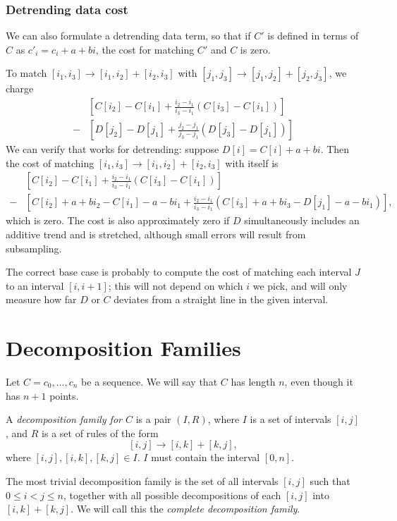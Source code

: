 \documentclass{article}
\begin{document}
\subsubsection{Detrending data cost}
We can also formulate a detrending data term, so that if $C'$ is
defined in terms of $C$ as $c'_i = c_i + a + bi$, the cost for
matching $C'$ and $C$ is zero.

To match $[i_1,i_3]\to [i_1,i_2] + [i_2, i_3]$ with $[j_1,j_3]\to [j_1,j_2] + [j_2, j_3]$, we charge
\begin{align*}
&\left[ C[i_2] - C[i_1] + \frac{i_2 - i_1}{i_3 - i_1}(C[i_3] - C[i_1])\right] \\
-&\left[ D[j_2] - D[j_1] + \frac{j_2 - j_1}{j_3 - j_1}(D[j_3] - D[j_1])\right] 
\end{align*}
We can verify that works for detrending: suppose $D[i] = C[i] + a + bi$. Then the cost of matching 
$[i_1,i_3]\to [i_1,i_2] + [i_2, i_3]$ with itself is
\begin{align*}
&\left[ C[i_2] - C[i_1] + \frac{i_2 - i_1}{i_3 - i_1}(C[i_3] - C[i_1])\right] \\
-&\left[ C[i_2] + a + bi_2 - C[i_1] -a - bi_1 + \frac{i_2 - i_1}{i_3 - i_1}(C[i_3] + a + bi_3 - D[j_1] - a - bi_1)\right],
\end{align*}
which is zero. The cost is also approximately zero if $D$
simultaneously includes an additive trend and is stretched, although
small errors will result from subsampling. 

The correct base case is probably to compute the cost of matching each
interval $J$ to an interval $[i,i+1]$; this will not depend on which
$i$ we pick, and will only measure how far $D$ or $C$ deviates from a
straight line in the given interval.


\section{Decomposition Families}

\begin{defn}
Let $C=c_0,\dots,c_n$ be a sequence. We will say that $C$ has length
$n$, even though it has $n+1$ points.

A {\em decomposition family for $C$} is a pair $(I, R)$, where $I$ is
a set of intervals $[i,j]$, and $R$ is a set of rules of the form
$$[i,j] \to [i,k] + [k,j],$$ where $[i,j], [i,k], [k,j]\in I$. $I$
  must contain the interval $[0,n]$.
\end{defn}

The most trivial decomposition family is the set of all intervals
$[i,j]$ such that $0\le i < j \le n$, together with all possible
decompositions of each $[i,j]$ into $[i,k] + [k,j]$. We will call this
the {\em complete decomposition family}.
\end{document}
